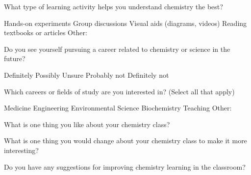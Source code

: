 \documentclass{exam}
\begin{document}
\begin{questions}
\question What type of learning activity helps you understand \makeemptybox{1in}chemistry the best?  
\begin{checkboxes}  
\choice Hands-on experiments  
   \choice Group discussions  
   \choice Visual aids (diagrams, videos)  
   \choice Reading textbooks or articles  
   \choice Other:
\end{checkboxes}


\question Do you see yourself pursuing a career related to chemistry or science in the future?
\begin{checkboxes}  
   \choice Definitely  
   \choice Possibly  
   \choice Unsure  
   \choice Probably not  
   \choice Definitely not
\end{checkboxes}
   
\question Which careers or fields of study are you interested in? (Select all that apply)  
   \begin{checkboxes}
   \choice Medicine  
   \choice Engineering  
   \choice Environmental Science  
   \choice Biochemistry  
   \choice Teaching  
   \choice Other:
\end{checkboxes}



\question What is one thing you like about your chemistry class?  

\makeemptybox{1in}

\question What is one thing you would change about your chemistry class to make it more interesting?  

\makeemptybox{1in}

\question Do you have any suggestions for improving chemistry learning in the classroom?  

\makeemptybox{1in}


\end{questions}
\end{document}
